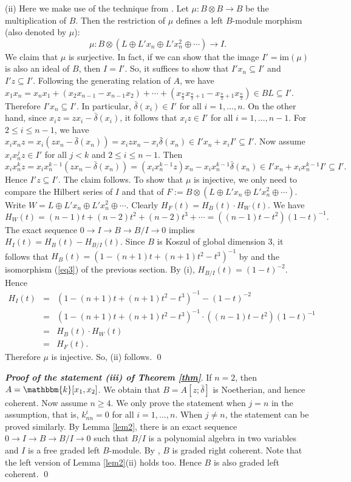 \documentclass[a4paper]{amsart}
\begin{document}
(ii) Here we make use of the technique from \cite[Proposition 7.3]{Sm}. Let $\mu:B{\otimes} B\to B$ be the multiplication of $B$. Then the restriction of $\mu$ defines a left $B$-module morphism (also denoted by $\mu$): $$\mu:B{\otimes}(L{\oplus} L'x_n{\oplus} L'x_n^2{\oplus}\cdots)\longrightarrow I.$$ We claim that $\mu$ is surjective. In fact, if we can show that the image $I'=\text{im}(\mu)$ is also an ideal of $B$, then $I=I'$. So, it suffices to show that $I'x_n\subseteq I'$ and $I'z\subseteq I'$. Following the generating relation of $A$, we have $x_1x_n=x_nx_1+(x_2x_{n-1}-x_{n-1}x_2)+\cdots+(x_{\frac{n}{2}}x_{\frac{n}{2}+1}-x_{\frac{n}{2}+1}x_{\frac{n}{2}})\in BL\subseteq I'$. Therefore $I'x_n\subseteq I'$. In particular, $\bar{\delta}(x_i)\in I'$ for all $i=1,\dots,n$. On the other hand, since $x_iz=zx_i-\bar{\delta}(x_i)$, it follows that $x_iz\in I'$ for all $i=1,\dots,n-1$. For $2\leq i\leq n-1$, we have $x_ix_nz=x_i(zx_n-\bar{\delta}(x_n))=x_izx_n-x_i\bar{\delta}(x_n)\in I'x_n+x_iI'\subseteq I'$. Now assume $x_ix_n^jz\in I'$ for all $j<k$ and $2\leq i\leq n-1$. Then $$x_ix_n^kz=x_ix_n^{k-1}(zx_n-\bar{\delta}(x_n))=(x_ix_n^{k-1}z)x_n-x_ix_n^{k-1}\bar{\delta}(x_n)\in I'x_n+x_ix_n^{k-1}I'\subseteq I'.$$ Hence $I'z\subseteq I'$. The claim follows.
To show that $\mu$ is injective, we only need to compare the Hilbert series of $I$ and that of $F:=B{\otimes}(L{\oplus} L'x_n{\oplus} L'x_n^2{\oplus}\cdots)$. Write $W=L{\oplus} L'x_n{\oplus} L'x_n^2{\oplus}\cdots$. Clearly $H_F(t)=H_B(t)\cdot H_W(t)$. We have $$H_W(t)=(n-1)t+(n-2)t^2+(n-2)t^3+\cdots=((n-1)t-t^2)(1-t)^{-1}.$$ The exact sequence $0\to I\to B\to B/I\to0$ implies $H_I(t)=H_B(t)-H_{B/I}(t)$. Since $B$ is Koszul of global dimension 3, it follows that $H_B(t)=\left(1-(n+1)t+(n+1)t^2-t^3\right)^{-1}$ by \cite[Theorem 5.9]{Sm1} and the isomorphism (\ref{eq3}) of the previous section. By (i), $H_{B/I}(t)=(1-t)^{-2}$. Hence
$$\begin{array}{ccl}
 H_{I}(t)&=&\left(1-(n+1)t+(n+1)t^2-t^3\right)^{-1}-(1-t)^{-2}\\
 &=&  \left(1-(n+1)t+(n+1)t^2-t^3\right)^{-1}\cdot\left((n-1)t-t^2\right)(1-t)^{-1}\\
&=&H_B(t)\cdot H_W(t)\\
&=&H_F(t).
 \end{array}
$$ Therefore $\mu$ is injective. So, (ii) follows. \qed

{\it\textbf{ Proof of the statement (iii) of Theorem \ref{thm}}}. If $n=2$, then $A={\mathbbm{k}}[x_1,x_2]$. We obtain that $B=A[z;\bar{\delta}]$ is Noetherian, and hence coherent. Now assume $n\ge4$. We only prove the statement when $j=n$ in the assumption, that is, $k^i_{nn}=0$ for all $i=1,\dots,n$. When $j\neq n$, the statement can be proved similarly. By Lemma \ref{lem2}, there is an exact sequence $0\longrightarrow I\longrightarrow B\longrightarrow B/I\longrightarrow0$ such that $B/I$ is a polynomial algebra in two variables and $I$ is a free graded left $B$-module. By \cite[Proposition 3.2]{Pi}, $B$ is graded right coherent. Note that the left version of Lemma \ref{lem2}(ii) holds too. Hence $B$ is also graded left coherent. \qed
\end{document}
